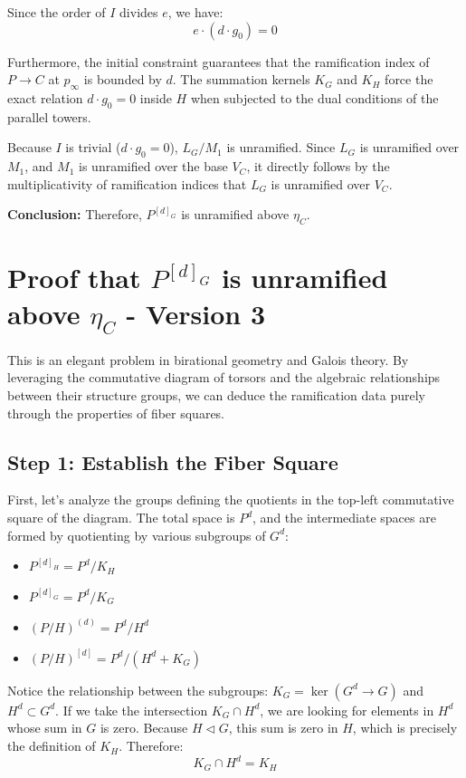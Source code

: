 Since the order of $I$ divides $e$, we have:
\[
e \cdot (d \cdot g_0) = 0
\]

Furthermore, the initial constraint guarantees that the ramification index of $P \to C$ at $p_\infty$ is bounded by $d$. The summation kernels $K_G$ and $K_H$ force the exact relation $d \cdot g_0 = 0$ inside $H$ when subjected to the dual conditions of the parallel towers. 

Because $I$ is trivial ($d \cdot g_0 = 0$), $L_G / M_1$ is unramified. Since $L_G$ is unramified over $M_1$, and $M_1$ is unramified over the base $V_C$, it directly follows by the multiplicativity of ramification indices that $L_G$ is unramified over $V_C$.

\textbf{Conclusion:} Therefore, $P^{[d]_G}$ is unramified above $\eta_C$.


\section*{Proof that $P^{[d]_G}$ is unramified above $\eta_C$ - Version 3}

This is an elegant problem in birational geometry and Galois theory. By leveraging the commutative diagram of torsors and the algebraic relationships between their structure groups, we can deduce the ramification data purely through the properties of fiber squares.

\subsection*{Step 1: Establish the Fiber Square}
First, let's analyze the groups defining the quotients in the top-left commutative square of the diagram. The total space is $P^d$, and the intermediate spaces are formed by quotienting by various subgroups of $G^d$:
\begin{itemize}
    \item $P^{[d]_H} = P^d / K_H$
    \item $P^{[d]_G} = P^d / K_G$
    \item $(P/H)^{(d)} = P^d / H^d$
    \item $(P/H)^{[d]} = P^d / (H^d + K_G)$
\end{itemize}

Notice the relationship between the subgroups: $K_G = \ker(G^d \to G)$ and $H^d \subset G^d$. 
If we take the intersection $K_G \cap H^d$, we are looking for elements in $H^d$ whose sum in $G$ is zero. Because $H \triangleleft G$, this sum is zero in $H$, which is precisely the definition of $K_H$. Therefore:
\[
K_G \cap H^d = K_H
\]

